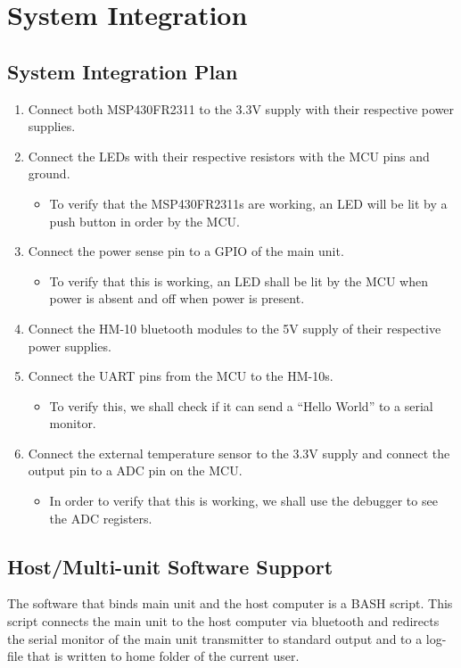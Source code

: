 \section{System Integration}
\subsection{System Integration Plan}
\begin{enumerate}
  \item Connect both MSP430FR2311 to the 3.3\si{\V} supply with their respective power supplies.
  \item Connect the LEDs with their respective resistors with the MCU pins and ground.
        \begin{itemize}
         \item To verify that the MSP430FR2311s are working, an LED will be lit by a push button in order by the MCU.
        \end{itemize}
  \item Connect the power sense pin to a GPIO of the main unit.
        \begin{itemize}
         \item  To verify that this is working, an LED shall be lit by the MCU when power is absent and off when power is present.
        \end{itemize}
  \item Connect the HM-10 bluetooth modules to the 5\si{\V} supply of their respective power supplies.
  \item Connect the UART pins from the MCU to the HM-10s.
        \begin{itemize}
         \item To verify this, we shall check if it can send a ``Hello World'' to a serial monitor.
        \end{itemize}
  \item Connect the external temperature sensor to the 3.3\si{\V} supply and connect the output pin to a ADC pin on the MCU.
        \begin{itemize}
         \item In order to verify that this is working, we shall use the debugger to see the ADC registers.
        \end{itemize}
\end{enumerate}
\subsection{Host/Multi-unit Software Support}
The software that binds main unit and the host computer is a BASH script. This script connects the main unit to the host computer via bluetooth and redirects the serial monitor of the main unit transmitter to standard output and to a log-file that is written to home folder of the current user.
